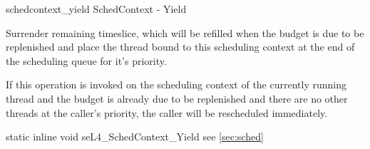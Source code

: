 %
%
%
%

\apidoc
{schedcontext_yield}
{SchedContext - Yield}
{Surrender remaining timeslice, which will be refilled when the budget is due to be replenished and place the thread bound to this scheduling context at the end of the scheduling queue for it's priority. 

If this operation is invoked on the scheduling context of the currently running thread and the budget is already due to be replenished and there are no other threads at the caller's priority, the caller will be rescheduled immediately.}
{static inline void seL4\_SchedContext\_Yield}
{
}
{\noret}
{see \autoref{sec:sched}}
